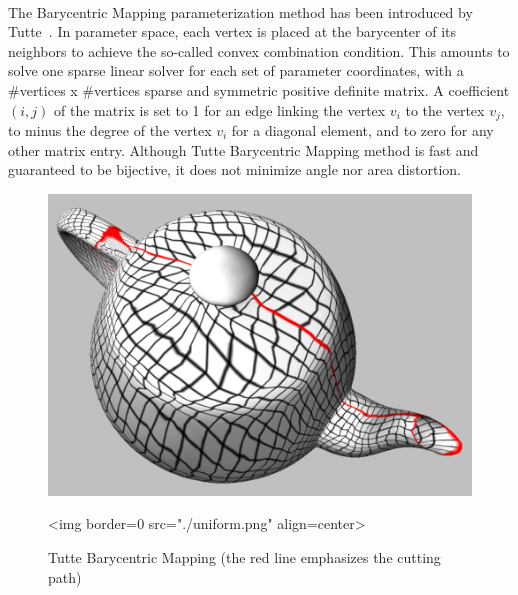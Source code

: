   \\

The Barycentric Mapping parameterization method has been introduced by
Tutte~\cite{cgal:fh-survey-05}. In parameter space, each vertex is
placed at the barycenter of its neighbors to achieve the so-called
convex combination condition. This amounts to solve one
sparse linear solver for each set of parameter coordinates, with a
\#vertices x \#vertices sparse and symmetric positive definite matrix. 
A coefficient $(i,j)$ of the matrix is set to 1 for an edge linking
the vertex $v_i$ to the vertex $v_j$, to minus the degree of the
vertex $v_i$ for a diagonal element, and to zero for any other matrix
entry. Although Tutte Barycentric Mapping method is fast and
guaranteed to be bijective, it does not minimize angle nor area
distortion.


\begin{figure}[bht]
    \begin{center}
        \begin{ccTexOnly}
            \includegraphics{Parameterization/uniform} %
        \end{ccTexOnly}
        \begin{ccHtmlOnly}
            <img border=0 src="./uniform.png" align=center>
        \end{ccHtmlOnly}
        \label{parameterization-fig-uniform}

        \caption{Tutte Barycentric Mapping (the red line emphasizes the cutting path)}
    \end{center}
\end{figure}


